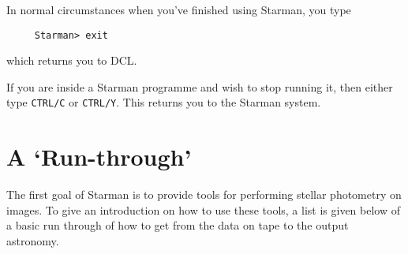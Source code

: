 In normal circumstances when you've finished using Starman, you type
\begin{verbatim}
     Starman> exit
\end{verbatim}

which returns you to {\small DCL}.

If you are inside a Starman programme and wish to stop running it, then either 
type {\tt CTRL/C} or {\tt CTRL/Y}. This returns you to the Starman system.



\section{A `Run-through'}

 The first goal of Starman is to provide tools for performing stellar 
 photometry on images. To give an introduction on how to use these tools,
 a list is given below of a basic run through of how to get from the
 data on tape to the output astronomy.
 
